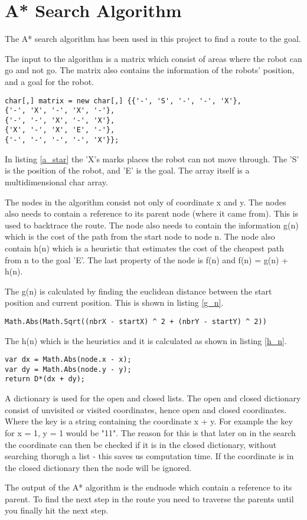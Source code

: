
\section{A* Search Algorithm}
\label{sec:aStar}

The A* search algorithm has been used in this project to find a route to the goal. 

The input to the algorithm is a matrix which consist of areas where the robot  can go and not go. The matrix also contains the information of the robots' position, and a goal for the robot.

\begin{lstlisting}[caption={An example of the matrix which the A* uses as input.}, label=a_star]
char[,] matrix = new char[,] {{'-', 'S', '-', '-', 'X'},
{'-', 'X', '-', 'X', '-'},
{'-', '-', 'X', '-', 'X'},
{'X', '-', 'X', 'E', '-'},
{'-', '-', '-', '-', 'X'}};
\end{lstlisting}

In listing \ref{a_star} the 'X's marks places the robot can not move through. The 'S' is the position of the robot, and 'E' is the goal. The array itself is a multidimensional char array.

The nodes in the algorithm consist not only of coordinate x and y. The nodes also needs to contain a reference to its parent node (where it came from). This is used to backtrace the route. The node also needs to contain the information g(n) which is the cost of the path from the start node to node n. The node also contain h(n) which is a heuristic that estimates the cost of the cheapest path from n to the goal 'E'. The last property of the node is f(n) and f(n) = g(n) + h(n).

The g(n) is calculated by finding the euclidean distance between the start position and current position. This is shown in listing \ref{g_n}.

\begin{lstlisting}[caption={Calculation of g(n).}, label=g_n]
Math.Abs(Math.Sqrt((nbrX - startX) ^ 2 + (nbrY - startY) ^ 2))
\end{lstlisting}

The h(n) which is the heuristics and it is calculated as shown in listing \ref{h_n}. 

\begin{lstlisting}[caption={Calculation of h(n).}, label=h_n]
var dx = Math.Abs(node.x - x);
var dy = Math.Abs(node.y - y);
return D*(dx + dy);
\end{lstlisting}

A dictionary is used for the open and closed lists. The open and closed dictionary consist of unvisited or visited coordinates, hence open and closed coordinates. Where the key is a string containing the coordinate x + y. For example the key for x = 1, y = 1 would be "11". The reason for this is that later on in the search the coordinate can then be checked if it is in the closed dictionary, without searching thorugh a list - this saves us computation time. If the coordinate is in the closed dictionary then the node will be ignored.

The output of the A* algorithm is the endnode which contain a reference to its parent. To find the next step in the route you need to traverse the parents until you finally hit the next step.
